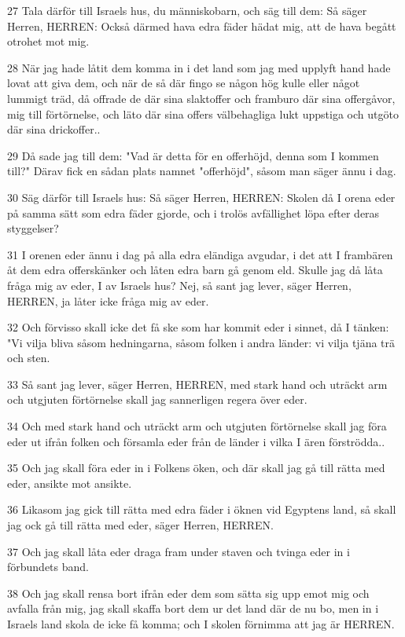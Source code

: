 \par 27 Tala därför till Israels hus, du människobarn, och säg till dem: Så säger Herren, HERREN: Också därmed hava edra fäder hädat mig, att de hava begått otrohet mot mig.
\par 28 När jag hade låtit dem komma in i det land som jag med upplyft hand hade lovat att giva dem, och när de så där fingo se någon hög kulle eller något lummigt träd, då offrade de där sina slaktoffer och framburo där sina offergåvor, mig till förtörnelse, och läto där sina offers välbehagliga lukt uppstiga och utgöto där sina drickoffer..
\par 29 Då sade jag till dem: "Vad är detta för en offerhöjd, denna som I kommen till?" Därav fick en sådan plats namnet "offerhöjd", såsom man säger ännu i dag.
\par 30 Säg därför till Israels hus: Så säger Herren, HERREN: Skolen då I orena eder på samma sätt som edra fäder gjorde, och i trolös avfällighet löpa efter deras styggelser?
\par 31 I orenen eder ännu i dag på alla edra eländiga avgudar, i det att I frambären åt dem edra offerskänker och låten edra barn gå genom eld. Skulle jag då låta fråga mig av eder, I av Israels hus? Nej, så sant jag lever, säger Herren, HERREN, ja låter icke fråga mig av eder.
\par 32 Och förvisso skall icke det få ske som har kommit eder i sinnet, då I tänken: "Vi vilja bliva såsom hedningarna, såsom folken i andra länder: vi vilja tjäna trä och sten.
\par 33 Så sant jag lever, säger Herren, HERREN, med stark hand och uträckt arm och utgjuten förtörnelse skall jag sannerligen regera över eder.
\par 34 Och med stark hand och uträckt arm och utgjuten förtörnelse skall jag föra eder ut ifrån folken och församla eder från de länder i vilka I ären förströdda..
\par 35 Och jag skall föra eder in i Folkens öken, och där skall jag gå till rätta med eder, ansikte mot ansikte.
\par 36 Likasom jag gick till rätta med edra fäder i öknen vid Egyptens land, så skall jag ock gå till rätta med eder, säger Herren, HERREN.
\par 37 Och jag skall låta eder draga fram under staven och tvinga eder in i förbundets band.
\par 38 Och jag skall rensa bort ifrån eder dem som sätta sig upp emot mig och avfalla från mig, jag skall skaffa bort dem ur det land där de nu bo, men in i Israels land skola de icke få komma; och I skolen förnimma att jag är HERREN.
